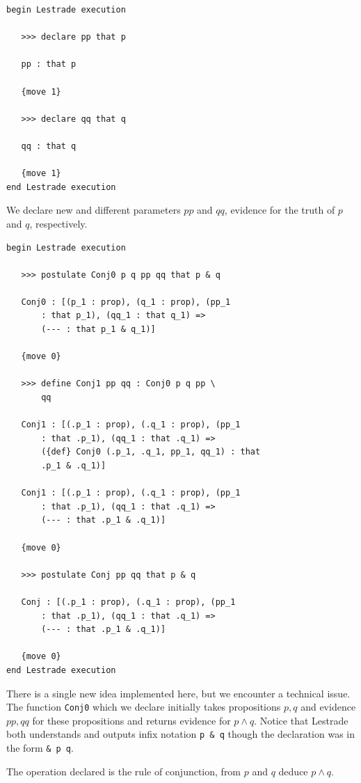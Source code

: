 \documentclass[12pt]{article}
\begin{document}
\begin{verbatim}
begin Lestrade execution

   >>> declare pp that p

   pp : that p

   {move 1}

   >>> declare qq that q

   qq : that q

   {move 1}
end Lestrade execution
\end{verbatim}

We declare new and different parameters $pp$ and $qq$, evidence for the truth of $p$ and $q$, respectively.

\begin{verbatim}
begin Lestrade execution

   >>> postulate Conj0 p q pp qq that p & q

   Conj0 : [(p_1 : prop), (q_1 : prop), (pp_1 
       : that p_1), (qq_1 : that q_1) => 
       (--- : that p_1 & q_1)]

   {move 0}

   >>> define Conj1 pp qq : Conj0 p q pp \
       qq

   Conj1 : [(.p_1 : prop), (.q_1 : prop), (pp_1 
       : that .p_1), (qq_1 : that .q_1) => 
       ({def} Conj0 (.p_1, .q_1, pp_1, qq_1) : that 
       .p_1 & .q_1)]

   Conj1 : [(.p_1 : prop), (.q_1 : prop), (pp_1 
       : that .p_1), (qq_1 : that .q_1) => 
       (--- : that .p_1 & .q_1)]

   {move 0}

   >>> postulate Conj pp qq that p & q

   Conj : [(.p_1 : prop), (.q_1 : prop), (pp_1 
       : that .p_1), (qq_1 : that .q_1) => 
       (--- : that .p_1 & .q_1)]

   {move 0}
end Lestrade execution

\end{verbatim}

There is a single new idea implemented here, but  we encounter a technical issue.  The function {\tt Conj0} which we declare initially takes propositions $p,q$ and evidence $pp, qq$ for these propositions and returns evidence for $p \wedge q$.  Notice that Lestrade both understands and outputs infix notation {\tt p \& q} though the declaration was in the form {\tt \& p q}.

The operation declared is the rule of conjunction, from $p$ and $q$ deduce $p \wedge q$.
\end{document}
